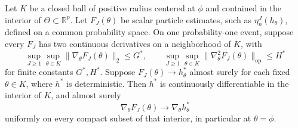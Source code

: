 \documentclass[11pt]{article}
\theoremstyle{thmstylethree}%
\begin{document}
\begin{thm}
\label{thm:consistent-derivatives}
Let $K$ be a closed ball of positive radius centered at $\phi$ and contained in the interior of $\Theta\subset\mathbb R^p$. Let $F_J(\theta)$ be scalar particle estimates, such as $\eta_n^J(h_\theta)$, defined on a common probability space. On one probability-one event, suppose every $F_J$ has two continuous derivatives on a neighborhood of $K$, with
\[
\sup_{J\geq1}\sup_{\theta\in K}\|\nabla_\theta F_J(\theta)\|_2\leq G^*,
\qquad
\sup_{J\geq1}\sup_{\theta\in K}\|\nabla_\theta^2 F_J(\theta)\|_{\mathrm{op}}\leq H^*
\]
for finite constants $G^*,H^*$. Suppose $F_J(\theta)\to h_\theta^*$ almost surely for each fixed $\theta\in K$, where $h^*$ is deterministic. Then $h^*$ is continuously differentiable in the interior of $K$, and almost surely
\[
\nabla_\theta F_J(\theta)\longrightarrow\nabla_\theta h_\theta^*
\]
uniformly on every compact subset of that interior, in particular at $\theta=\phi$.
\end{thm}
\end{document}
